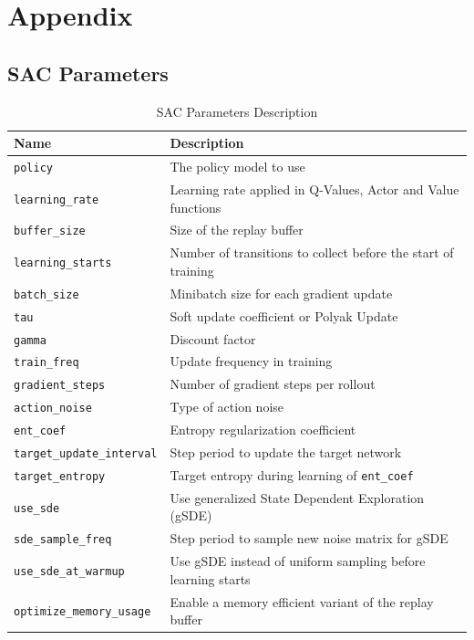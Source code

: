 \chapter{Appendix} \label{appendix}

\section{\ac{SAC} Parameters}

\begin{table}[ht!]
	\centering
	\caption{\ac{SAC} Parameters Description}
	\begin{tabular}{lp{8cm}}
		\toprule
		\textbf{Name} & \textbf{Description} \\
		\midrule
		\texttt{policy} & The policy model to use  \\
		\texttt{learning\_rate} & Learning rate applied in Q-Values, Actor and Value functions \\
		\texttt{buffer\_size} & Size of the replay buffer \\
		\texttt{learning\_starts} & Number of transitions to collect before the start of training \\
		\texttt{batch\_size} &  Minibatch size for each gradient update\\
		\texttt{tau} &  Soft update coefficient or Polyak Update \\
		\texttt{gamma} & Discount factor \\
		\texttt{train\_freq} &  Update frequency in training \\
		\texttt{gradient\_steps} & Number of gradient steps per rollout \\
		\texttt{action\_noise} & Type of action noise \\
		\texttt{ent\_coef} & Entropy regularization coefficient \\
		\texttt{target\_update\_interval} &  Step period to update the target network \\
		\texttt{target\_entropy} & Target entropy during learning of \texttt{ent\_coef} \\
		\texttt{use\_sde} &  Use generalized State Dependent Exploration (gSDE) \\
		\texttt{sde\_sample\_freq} & Step period to sample new noise matrix for gSDE \\
		\texttt{use\_sde\_at\_warmup} &  Use gSDE instead of uniform sampling before learning starts \\
		\texttt{optimize\_memory\_usage} & Enable a memory efficient variant of the replay buffer

\end{tabular}
\end{table}
